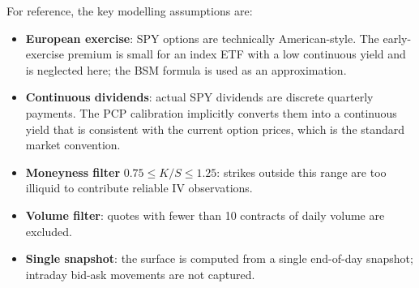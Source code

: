 For reference, the key modelling assumptions are:
\begin{itemize}
    \item \textbf{European exercise}: SPY options are technically American-style.
          The early-exercise premium is small for an index ETF with a low continuous yield
          and is neglected here; the BSM formula is used as an approximation.
    \item \textbf{Continuous dividends}: actual SPY dividends are discrete quarterly
          payments. The PCP calibration implicitly converts them into a continuous yield
          that is consistent with the current option prices, which is the standard
          market convention.
    \item \textbf{Moneyness filter} $0.75 \leq K/S \leq 1.25$: strikes outside
          this range are too illiquid to contribute reliable IV observations.
    \item \textbf{Volume filter}: quotes with fewer than 10 contracts of daily volume
          are excluded.
    \item \textbf{Single snapshot}: the surface is computed from a single end-of-day
          snapshot; intraday bid-ask movements are not captured.
\end{itemize}

